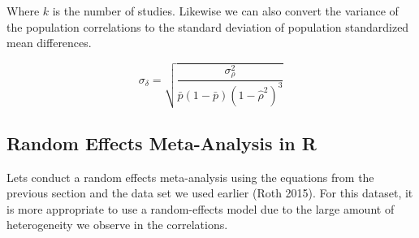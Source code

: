 \documentclass[
  letterpaper,
  DIV=11,
  numbers=noendperiod]{scrreprt}
\begin{document}
Where \(k\) is the number of studies. Likewise we can also convert the
variance of the population correlations to the standard deviation of
population standardized mean differences.

\[
\sigma_\delta = \sqrt{\frac{\sigma_\rho^2}{\bar{p}(1-\bar{p})(1-\hat{\rho}^2)^3}}
\]

\hypertarget{random-effects-meta-analysis-in-r}{%
\subsection{Random Effects Meta-Analysis in
R}\label{random-effects-meta-analysis-in-r}}

Lets conduct a random effects meta-analysis using the equations from the
previous section and the data set we used earlier (Roth 2015). For this
dataset, it is more appropriate to use a random-effects model due to the
large amount of heterogeneity we observe in the correlations.
\end{document}
